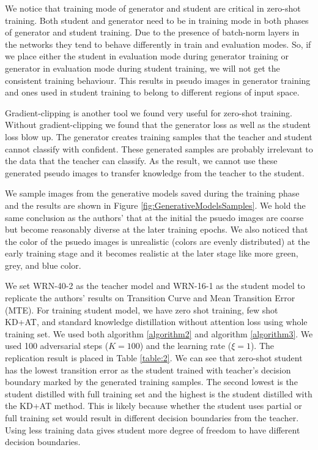 \documentclass{article}
\begin{document}
We notice that training mode of generator and student are critical in zero-shot training. Both student and generator need to be in training mode in both phases of generator and student training. Due to the presence of batch-norm layers in the networks they tend to behave differently in train and evaluation modes. So, if we place either the student in evaluation mode during generator training or generator in evaluation mode during student training, we will not get the consistent training behaviour. This results in pseudo images in generator training and ones used in student training to belong to different regions of input space.

Gradient-clipping is another tool we found very useful for zero-shot training. Without gradient-clipping we found that the generator loss as well as the student loss blow up. The generator creates training samples that the teacher and student cannot classify with confident. These generated samples are probably irrelevant to the data that the teacher can classify. As the result, we cannot use these generated pseudo images to transfer knowledge from the teacher to the student.

We sample images from the generative models saved during the training phase and the results are shown in Figure \ref{fig:GenerativeModelsSamples}.
We hold the same conclusion as the authors' that at the initial the psuedo images are coarse but become reasonably diverse at the later training epochs.
We also noticed that the color of the psuedo images is unrealistic (colors are evenly distributed) at the early training stage and it becomes realistic
at the later stage like more green, grey, and blue color.

We set WRN-40-2 as the teacher model and WRN-16-1 as the student model to replicate the authors' results on Transition Curve and Mean Transition Error (MTE). For training student model, we have zero shot training, few shot KD+AT, and standard knowledge distillation without attention loss using whole training set. We used both algorithm \ref{algorithm2} and algorithm \ref{algorithm3}. We used 100 adversarial steps ($K = 100$) and the learning rate ($\xi = 1$). The replication result is placed in Table \ref{table:2}. We can see that zero-shot student has the lowest transition error as the student trained with teacher's decision boundary marked by the generated training samples. The second lowest is the student distilled with full training set and the highest is the student distilled with the KD+AT method. This is likely because whether the student uses partial or full training set would result in different decision boundaries from the teacher. Using less training data gives student more degree of freedom to have different decision boundaries.
\end{document}
